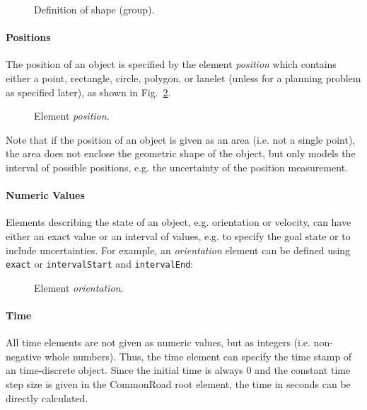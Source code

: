 \begin{figure}[!htpb]
	\small
	\caption{Definition of shape (group).}
	\label{fig:auxiliary}
\end{figure}

\paragraph{Positions}
The position of an object is specified by the element \emph{position} which contains either a point, rectangle, circle, polygon, or lanelet (unless for a planning problem as specified later), as shown in Fig.~\ref{fig:position}.

\begin{figure}[!htpb]
	\small
	\caption{Element \textit{position}.}
	\label{fig:position}
\end{figure}

Note that if the position of an object is given as an area (i.e. not a single point), the area does not enclose the geometric shape of the object, but only models the interval of possible positions, e.g. the uncertainty of the position measurement.


\paragraph{Numeric Values}
Elements describing the state of an object, e.g. orientation or velocity, can have either an exact value or an interval of values, e.g. to specify the goal state or to include uncertainties.
For example, an \textit{orientation} element can be defined using \texttt{exact} or \texttt{intervalStart} and \texttt{intervalEnd}:

\begin{figure}[!htpb]
	\small
	\caption{Element \textit{orientation}.}
	\label{fig:XML_orientation}
\end{figure}

\paragraph{Time}
All time elements are not given as numeric values, but as integers (i.e. non-negative whole numbers). Thus, the time element can specify the time stamp of an time-discrete object. Since the initial time is always $0$ and the constant time step size is given in the CommonRoad root element, the time in seconds can be directly calculated.
